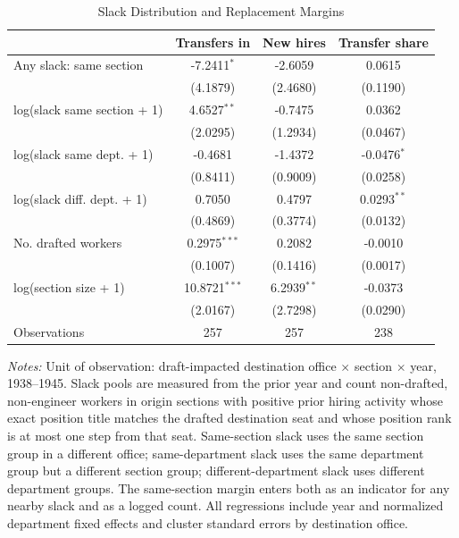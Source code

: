 \begin{table}[htbp]
\centering
\caption{Slack Distribution and Replacement Margins}
\small
\begin{threeparttable}
\begin{tabular}{lccc}
\toprule
 & Transfers in & New hires & Transfer share \\
\midrule
Any slack: same section & -7.2411$^{*}$ & -2.6059 & 0.0615 \\
  & (4.1879) & (2.4680) & (0.1190) \\[3pt]
log(slack same section + 1) & 4.6527$^{**}$ & -0.7475 & 0.0362 \\
  & (2.0295) & (1.2934) & (0.0467) \\[3pt]
log(slack same dept. + 1) & -0.4681 & -1.4372 & -0.0476$^{*}$ \\
  & (0.8411) & (0.9009) & (0.0258) \\[3pt]
log(slack diff. dept. + 1) & 0.7050 & 0.4797 & 0.0293$^{**}$ \\
  & (0.4869) & (0.3774) & (0.0132) \\[3pt]
No. drafted workers & 0.2975$^{***}$ & 0.2082 & -0.0010 \\
  & (0.1007) & (0.1416) & (0.0017) \\[3pt]
log(section size + 1) & 10.8721$^{***}$ & 6.2939$^{**}$ & -0.0373 \\
  & (2.0167) & (2.7298) & (0.0290) \\[3pt]
\midrule
Observations & 257 & 257 & 238 \\
\bottomrule
\end{tabular}
\begin{tablenotes}[flushleft]\footnotesize
\item \textit{Notes:} Unit of observation: draft-impacted destination office $\times$ section $\times$ year, 1938--1945. Slack pools are measured from the prior year and count non-drafted, non-engineer workers in origin sections with positive prior hiring activity whose exact position title matches the drafted destination seat and whose position rank is at most one step from that seat. Same-section slack uses the same section group in a different office; same-department slack uses the same department group but a different section group; different-department slack uses different department groups. The same-section margin enters both as an indicator for any nearby slack and as a logged count. All regressions include year and normalized department fixed effects and cluster standard errors by destination office.
\end{tablenotes}
\end{threeparttable}
\end{table}
